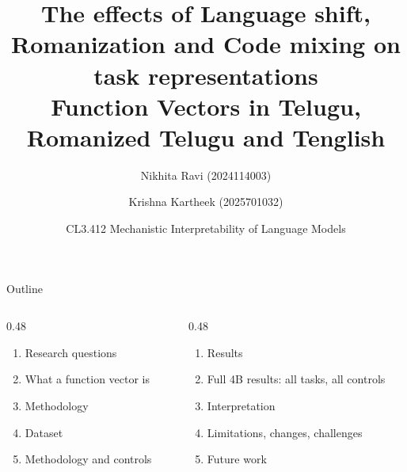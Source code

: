 \documentclass[aspectratio=169,11pt]{beamer}
\title{The effects of Language shift, Romanization and Code mixing on task representations\\Function Vectors in Telugu, Romanized Telugu and Tenglish}
\author[2024114003, 2025701032]{Nikhita Ravi (2024114003) \and Krishna Kartheek (2025701032)}
\date{CL3.412 Mechanistic Interpretability of Language Models}
\newcommand{\tight}{\setlength{\itemsep}{2pt plus 1pt minus 1pt}}
\begin{document}
\begin{frame}[plain]
  \titlepage
\end{frame}

\begin{frame}{Outline}
  \vspace{2mm}
  \begin{columns}[T]
    \begin{column}{0.48\textwidth}
      \begin{enumerate}\small\tight
        \item Research questions
        \item What a function vector is
        \item Methodology
        \item Dataset
        \item Methodology and controls
      \end{enumerate}
    \end{column}
    \begin{column}{0.48\textwidth}
      \begin{enumerate}\small\tight
        \setcounter{enumi}{5}
        \item Results
        \item Full 4B results: all tasks, all controls
        \item Interpretation
        \item Limitations, changes, challenges
        \item Future work
      \end{enumerate}
    \end{column}
  \end{columns}
\end{frame}
\end{document}
